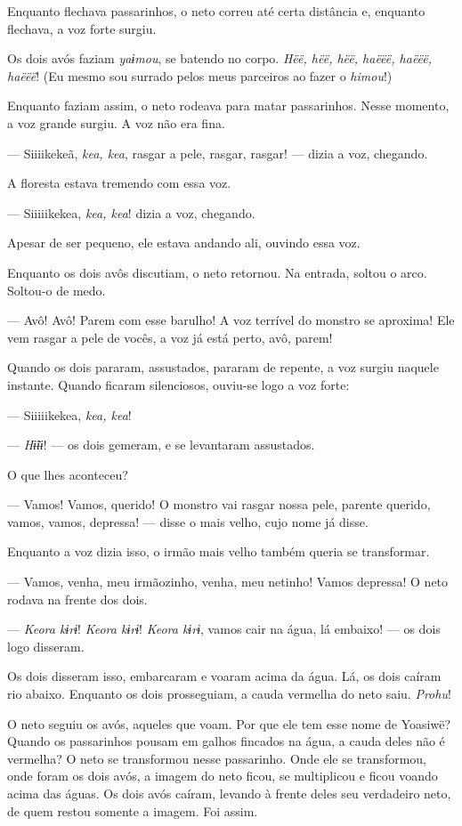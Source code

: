 Enquanto flechava passarinhos, o neto correu até certa distância e,
enquanto flechava, a voz forte surgiu. 

Os dois avós faziam \textit{yaɨmou}, se batendo no
corpo. \textit{Hëë, hëë, hëë, haëëë, haëëë, haëëë}! (Eu mesmo sou surrado
pelos meus parceiros ao fazer o \textit{himou}!) 

Enquanto faziam assim, o neto rodeava para matar passarinhos. Nesse
momento, a voz grande surgiu. A voz não era fina. 

--- Siiiikekeã, \textit{kea, kea}, rasgar a pele, rasgar, rasgar! --- dizia
a voz, chegando. 

A floresta estava tremendo com essa voz. 

--- Siiiiikekea, \textit{kea, kea}! dizia a voz, chegando. 

Apesar de ser pequeno, ele estava andando ali, ouvindo essa voz. 

Enquanto os dois avôs discutiam, o neto retornou. Na entrada, soltou o
arco. Soltou-o de medo. 

--- Avô! Avô! Parem com esse barulho! A voz terrível do monstro se
aproxima! Ele vem rasgar a pele de vocês, a voz já está perto, avô,
parem! 

Quando os dois pararam, assustados, pararam de repente, a voz surgiu
naquele instante. Quando ficaram silenciosos, ouviu-se logo a voz
forte: 

--- Siiiiikekea, \textit{kea, kea}! 

--- \textit{Hɨ̃ɨɨ}! --- os dois gemeram, e se levantaram assustados. 

O que lhes aconteceu?

--- Vamos! Vamos, querido! O monstro vai rasgar nossa pele, parente
querido, vamos, vamos, depressa! --- disse o mais velho, cujo nome já
disse. 

Enquanto a voz dizia isso, o irmão mais velho também queria se
transformar. 

--- Vamos, venha, meu irmãozinho, venha, meu netinho! Vamos depressa! O
neto rodava na frente dos dois. 

--- \textit{Keora kɨrɨ}! \textit{Keora kɨrɨ}! \textit{Keora kɨrɨ}, vamos cair na água, lá
embaixo! --- os dois logo disseram. 

Os dois disseram isso, embarcaram e voaram acima da água. Lá, os dois
caíram rio abaixo. Enquanto os dois prosseguiam, a cauda vermelha do
neto saiu. \textit{Prohu}! 

O neto seguiu os avós, aqueles que voam. Por que ele tem esse nome de
Yoasiwë? Quando os passarinhos pousam em galhos fincados na água, a
cauda deles não é vermelha? O neto se transformou nesse passarinho. Onde
ele se transformou, onde foram os dois avós, a imagem do neto ficou, se
multiplicou e ficou voando acima das águas. Os dois avós caíram, levando
à frente deles seu verdadeiro neto, de quem restou somente a imagem.
Foi assim. 

